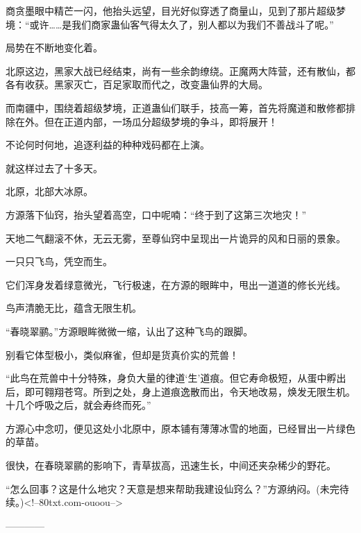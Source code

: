 \begin{this_body}
商贪墨眼中精芒一闪，他抬头远望，目光好似穿透了商量山，见到了那片超级梦境：“或许……是我们商家蛊仙客气得太久了，别人都以为我们不善战斗了呢。”

局势在不断地变化着。

北原这边，黑家大战已经结束，尚有一些余韵缭绕。正魔两大阵营，还有散仙，都各有收获。黑家灭亡，百足家取而代之，改变蛊仙界的大局。

而南疆中，围绕着超级梦境，正道蛊仙们联手，技高一筹，首先将魔道和散修都排除在外。但在正道内部，一场瓜分超级梦境的争斗，即将展开！

不论何时何地，追逐利益的种种戏码都在上演。

就这样过去了十多天。

北原，北部大冰原。

方源落下仙窍，抬头望着高空，口中呢喃：“终于到了这第三次地灾！”

天地二气翻滚不休，无云无雾，至尊仙窍中呈现出一片诡异的风和日丽的景象。

一只只飞鸟，凭空而生。

它们浑身发着绿意微光，飞行极速，在方源的眼眸中，甩出一道道的修长光线。

鸟声清脆无比，蕴含无限生机。

“春晓翠鹂。”方源眼眸微微一缩，认出了这种飞鸟的跟脚。

别看它体型极小，类似麻雀，但却是货真价实的荒兽！

“此鸟在荒兽中十分特殊，身负大量的律道‘生’道痕。但它寿命极短，从蛋中孵出后，即可翱翔苍穹。所到之处，身上道痕逸散而出，令天地改易，焕发无限生机。十几个呼吸之后，就会寿终而死。”

方源心中念叨，便见这处小北原中，原本铺有薄薄冰雪的地面，已经冒出一片绿色的草苗。

很快，在春晓翠鹂的影响下，青草拔高，迅速生长，中间还夹杂稀少的野花。

“怎么回事？这是什么地灾？天意是想来帮助我建设仙窍么？”方源纳闷。(未完待续。)<!--80txt.com-ouoou-->

------------

\end{this_body}

